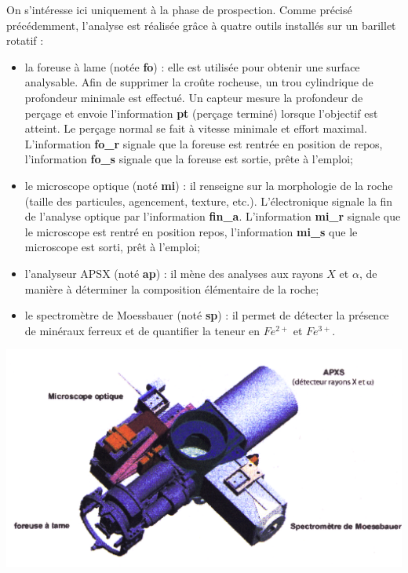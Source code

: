 \documentclass[10pt,fleqn]{article} %
\begin{document}
\begin{multicols}{2}
\begin{multicols}{2}
On s’intéresse ici uniquement à la phase de prospection. Comme précisé précédemment, l’analyse est réalisée grâce à quatre outils installés sur un barillet rotatif :
\begin{itemize}
\item la foreuse à lame (notée \textbf{fo}) : elle est utilisée pour obtenir une surface analysable. Afin de supprimer la croûte rocheuse, un trou cylindrique de profondeur minimale est effectué. Un capteur mesure la profondeur de perçage et envoie l’information \textbf{pt} (perçage terminé) lorsque l’objectif est atteint. Le perçage normal se fait à vitesse minimale et effort maximal. L’information \textbf{fo\_r} signale que la foreuse est rentrée en position de repos, l’information \textbf{fo\_s} signale que la foreuse est sortie, prête à l’emploi;
\item le microscope optique (noté \textbf{mi}) : il renseigne sur la morphologie de la roche (taille des particules, agencement, texture, etc.). L’électronique signale la fin de l’analyse optique par l’information \textbf{fin\_a}. L’information \textbf{mi\_r} signale que le microscope est rentré en position repos, l’information \textbf{mi\_s} que le microscope est sorti, prêt à l’emploi;
\item l’analyseur APSX (noté \textbf{ap}) : il mène des analyses aux rayons $X$ et $\alpha$, de manière à déterminer la composition élémentaire de la roche;
\item le spectromètre de Moessbauer (noté \textbf{sp}) : il permet de détecter la présence de minéraux ferreux et de quantifier la teneur en $Fe^{2+}$ et $Fe^{3+}$.
\end{itemize}


\begin{center}
\includegraphics[width=\linewidth]{images/fig_05.png}
\end{center}


\end{multicols}
\end{multicols}
\end{document}
